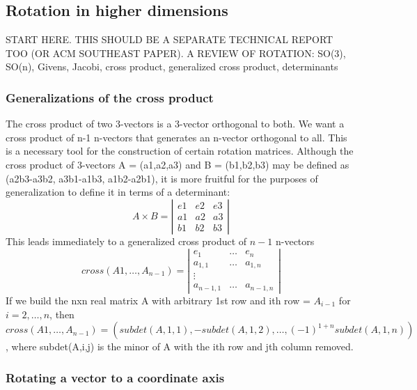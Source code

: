 \documentclass[12pt]{article}
\begin{document}
\clearpage

\subsection{Rotation in higher dimensions}

START HERE.
THIS SHOULD BE A SEPARATE TECHNICAL REPORT TOO (OR ACM SOUTHEAST PAPER).
A REVIEW OF ROTATION: SO(3), SO(n), Givens, Jacobi, cross product, generalized cross product, determinants

\subsubsection{Generalizations of the cross product}

The cross product of two 3-vectors is a 3-vector orthogonal to both.
We want a cross product of n-1 n-vectors that generates an n-vector
orthogonal to all.
This is a necessary tool for the construction of certain rotation matrices.
Although the cross product of 3-vectors A = (a1,a2,a3) and B = (b1,b2,b3) 
may be defined as (a2b3-a3b2, a3b1-a1b3, a1b2-a2b1), it is more fruitful for the 
purposes of generalization to define it in terms of a determinant:
\[
A \times B = 
\left|
\begin{array}{ccc}
e1 & e2 & e3 \\
a1 & a2 & a3 \\
b1 & b2 & b3
\end{array}
\right|
\]
This leads immediately to a generalized cross product of $n-1$ n-vectors
\[
cross (A1,\ldots,A_{n-1}) = 
\left|
\begin{array}{ccc}
e_1 & \ldots & e_n \\
a_{1,1} & \ldots & a_{1,n} \\
\vdots \\
a_{n-1,1} & \ldots & a_{n-1,n} 
\end{array}
\right|
\]
If we build the nxn real matrix A with arbitrary 1st row 
and ith row = $A_{i-1}$ for $i=2,\ldots,n$, then
$cross (A1, \ldots,A_{n-1}) =
(subdet(A,1,1), -subdet(A,1,2), \ldots, (-1)^{1+n} subdet(A,1,n))$,
where subdet(A,i,j) is the minor of A with the ith row and jth column removed.

\subsubsection{Rotating a vector to a coordinate axis}
\end{document}
